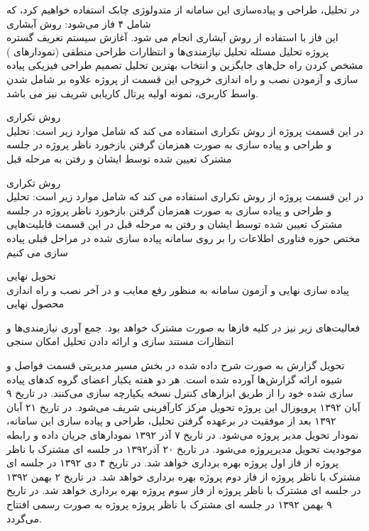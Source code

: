 در تحلیل، طراحی و پیاده‌سازی این سامانه از متدولوژی چابک استفاده خواهیم کرد، که شامل ۴ فاز می‌شود:
 روش آبشاری\\
این فاز با استفاده از روش آبشاری انجام می شود.
 آغازش سیستم
 تعریف گستره پروژه
 تحلیل مسئله
 تحلیل نیازمندی‌ها و انتظارات 
 طراحی منطقی (‌نمودارهای )
 مشخص کردن راه حل‌های جایگزین و انتخاب بهترین 
 تحلیل تصمیم
 طراحی فیزیکی
 پیاده سازی و آزمودن
 نصب و راه اندازی
خروجی این قسمت از پروژه علاوه بر شامل شدن واسط کاربری، نمونه اولیه پرتال     کاریابی شریف نیز می باشد.
    
 روش تکراری\\
در این قسمت پروژه از روش تکراری استفاده می کند که شامل موارد زیر است:
 تحلیل و طراحی و پیاده سازی به صورت همزمان 
 گرفتن بازخورد ناظر پروژه در جلسه  مشترک تعیین شده توسط ایشان و رفتن به مرحله قبل


 روش تکراری\\
    در این قسمت پروژه از روش تکراری استفاده می کند که شامل موارد زیر است:
 تحلیل و طراحی و پیاده سازی به صورت همزمان 
 گرفتن بازخورد ناظر پروژه در جلسه  مشترک تعیین شده توسط ایشان و رفتن به مرحله قبل
در این قسمت قابلیت‌هایی مختص حوزه فناوری اطلاعات را بر روی سامانه پیاده سازی شده در مراحل قبلی پیاده سازی می کنیم 
   
   
 تحویل نهایی \\
پیاده سازی نهایی و آزمون سامانه به منظور رفع معایب و در آخر نصب و راه اندازی محصول نهایی

فعالیت‌های زیر نیز در کلیه فاز‌ها به صورت مشترک خواهد بود.
 جمع آوری نیازمندی‌ها و انتظارات
 مستند سازی و ارائه دادن 
 تحلیل امکان سنجی


 تحویل گزارش به صورت شرح داده شده  در بخش مسیر مدیریتی قسمت  فواصل و شیوه ارائه گزارش‌ها آورده شده است.
 هر دو هفته یکبار اعضای گروه کدهای پیاده سازی شده خود را از طریق ابزارهای کنترل نسخه یکپارچه سازی می‌کنند.
 در تاریخ ۹ آبان ۱۳۹۲ پروپوزال این پروژه تحویل مرکز کارآفرینی شریف می‌شود.
 در تاریخ ۲۱ آبان ۱۳۹۲ بعد از موفقیت در برعهده گرفتن تحلیل، طراحی و پیاده سازی این سامانه، نمودار  تحویل مدیر پروژه می‌شود.
 در تاریخ ۷ آذر ۱۳۹۲ نمودار‌های جریان داده و رابطه موجودیت تحویل مدیرپروژه می‌شود.
 در تاریخ ۲۰ آذر۱۳۹۲  در جلسه ای مشترک با ناظر پروژه از فاز اول پروژه بهره برداری خواهد شد.
 در تاریخ ۴ دی ۱۳۹۲  در جلسه ای مشترک با ناظر پروژه از فاز دوم پروژه بهره برداری خواهد شد.
 در تاریخ ۲ بهمن ۱۳۹۲  در جلسه ای مشترک با ناظر پروژه از فاز سوم پروژه بهره برداری خواهد شد.
 در تاریخ ۹ بهمن ۱۳۹۲  در جلسه ای مشترک با ناظر پروژه پروژه به صورت رسمی افتتاح می‌گردد.
